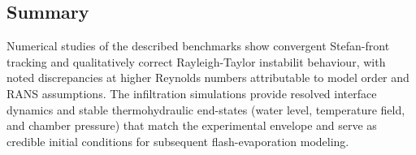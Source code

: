 \subsection{Summary}
Numerical studies of the described benchmarks show convergent Stefan-front 
tracking and qualitatively correct Rayleigh-Taylor instabilit behaviour, 
with noted discrepancies at higher Reynolds numbers attributable to model order and RANS assumptions. 
The infiltration simulations provide resolved interface dynamics and stable 
thermohydraulic end-states (water level, temperature field, and chamber pressure) 
that match the experimental envelope and serve as credible 
initial conditions for subsequent flash-evaporation modeling.